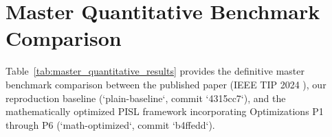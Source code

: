 \section{Master Quantitative Benchmark Comparison}
\label{sec:master_quantitative_results}

Table~\ref{tab:master_quantitative_results} provides the definitive master benchmark comparison between the published paper (IEEE TIP 2024 \cite{tao2024unsupervised}), our reproduction baseline (`plain-baseline`, commit `4315cc7`), and the mathematically optimized PISL framework incorporating Optimizations P1 through P6 (`math-optimized`, commit `b4ffedd`).

\begin{table}[ht]
\centering
\caption[Master quantitative benchmark comparison on Market-1501 and VeRi-776]{Master quantitative benchmark comparison between the published paper (TIP 2024), reproduction baseline, and mathematically optimized PISL (P1--P6) on Market-1501 and VeRi-776.}
\label{tab:master_quantitative_results}
\end{table}

